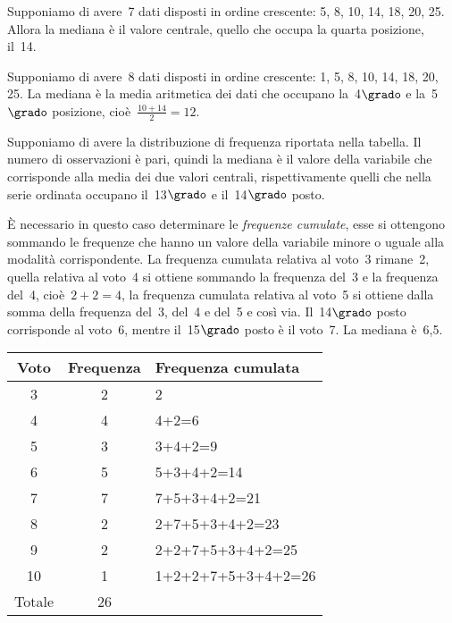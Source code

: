 \begin{exrig}
\begin{esempio}
Supponiamo di avere~7 dati disposti in ordine crescente: 5, 8, 10, 14, 18, 
20, 25.
Allora la mediana è il valore centrale, quello che occupa la quarta 
posizione, il~14.
\end{esempio}

\begin{esempio}
Supponiamo di avere~8 dati disposti in ordine crescente: 1, 5, 8, 10, 14, 
18, 20, 25.
La mediana è la media aritmetica dei dati che occupano la~4$\grado$ e 
la~5$\grado$ posizione, cioè~$\frac{10+14}{2}=12$.
\end{esempio}

\begin{esempio}
Supponiamo di avere la distribuzione di frequenza riportata nella tabella.
Il numero di osservazioni è pari, quindi la mediana è il valore della 
variabile che corrisponde alla media dei due
valori centrali, rispettivamente quelli che nella serie ordinata occupano 
il~13$\grado$ e il~14$\grado$ posto.

È necessario in questo caso determinare le \emph{frequenze cumulate}, esse 
si ottengono sommando le frequenze che hanno un valore della
variabile minore o uguale alla modalità corrispondente.
La frequenza cumulata relativa al voto~3 rimane~2, quella relativa al 
voto~4 si ottiene sommando
la frequenza del~3 e la frequenza del~4, cioè~$2+2=4$, la frequenza 
cumulata relativa al voto~5 si ottiene dalla somma
della frequenza del~3, del~4 e del~5 e così via. Il~14$\grado$ posto 
corrisponde al voto~6, mentre il~15$\grado$ posto è il voto~7.
La mediana è~6,5.
\begin{center}
\begin{tabular}{ccl}
\toprule
Voto & Frequenza & Frequenza cumulata\\
\midrule
3 & 2 & 2 \\
4 & 4 & 4+2=6 \\
5 & 3 & 3+4+2=9 \\
6 & 5 & 5+3+4+2=14 \\
7 & 7 & 7+5+3+4+2=21 \\
8 & 2 & 2+7+5+3+4+2=23 \\
9 & 2 & 2+2+7+5+3+4+2=25 \\
10 & 1 & 1+2+2+7+5+3+4+2=26 \\
\midrule
Totale & 26 & \\
\bottomrule
\end{tabular}
\end{center}
\end{esempio}
\end{exrig}

